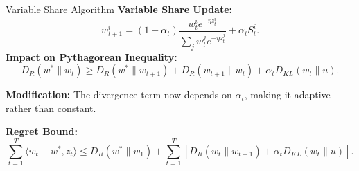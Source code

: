 \documentclass{beamer}
\begin{document}
\begin{small}
\begin{frame}{Variable Share Algorithm}
\textbf{Variable Share Update:}  
\[
w_{t+1}^i = (1 - \alpha_t) \frac{w_t^i e^{-\eta z_t^i}}{\sum_j w_t^j e^{-\eta z_t^j}} + \alpha_t S_t^i.
\]
\textbf{Impact on Pythagorean Inequality:}
\[
D_R(w^* \| w_t) \geq D_R(w^* \| w_{t+1}) + D_R(w_{t+1} \| w_t) + \alpha_t D_{KL}(w_t \| u).
\]

\textbf{Modification:}  
\textcolor{mathcolor}{The divergence term now depends on \( \alpha_t \), making it adaptive rather than constant.}

\textbf{Regret Bound:}  
\[
\sum_{t=1}^{T} \langle w_t - w^*, z_t \rangle \leq D_R(w^* \| w_1) + \sum_{t=1}^{T} \left[ D_R(w_t \| w_{t+1}) + \alpha_t D_{KL}(w_t \| u) \right].
\]
\end{frame}


\end{small}
\end{document}
